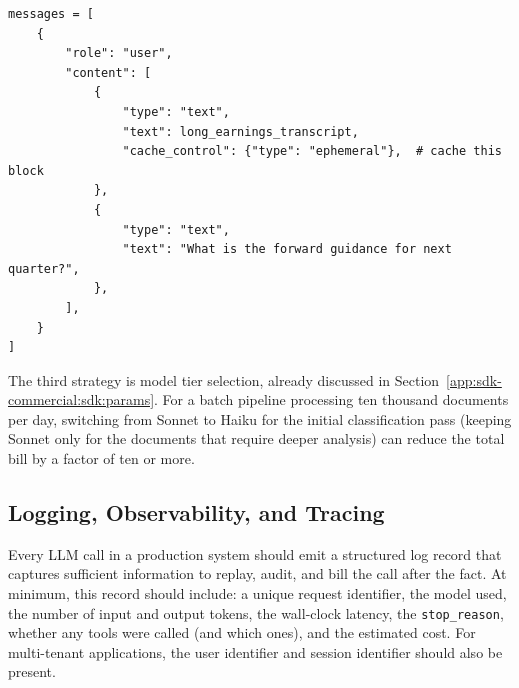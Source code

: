 \begin{verbatim}
messages = [
    {
        "role": "user",
        "content": [
            {
                "type": "text",
                "text": long_earnings_transcript,
                "cache_control": {"type": "ephemeral"},  # cache this block
            },
            {
                "type": "text",
                "text": "What is the forward guidance for next quarter?",
            },
        ],
    }
]
\end{verbatim}

The third strategy is model tier selection, already discussed in
Section~\ref{app:sdk-commercial:sdk:params}. For a batch pipeline processing ten
thousand documents per day, switching from Sonnet to Haiku for the initial
classification pass (keeping Sonnet only for the documents that require deeper
analysis) can reduce the total bill by a factor of ten or more.

\subsection{Logging, Observability, and Tracing}
\label{app:sdk-commercial:production:observability}

Every LLM call in a production system should emit a structured log record that
captures sufficient information to replay, audit, and bill the call after the fact.
At minimum, this record should include: a unique request identifier, the model used,
the number of input and output tokens, the wall-clock latency, the \texttt{stop\_reason},
whether any tools were called (and which ones), and the estimated cost. For
multi-tenant applications, the user identifier and session identifier should also be
present.

